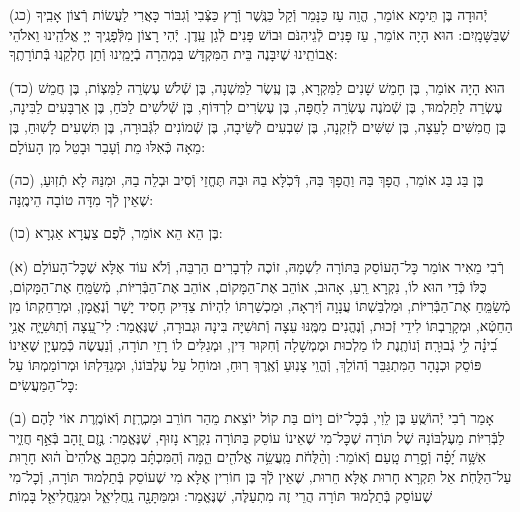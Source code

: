 \documentclass[twoside, openany, parskip=half, 11pt]{book}
\begin{document}
(כג)
יְֿהוּדָה בֶּן תֵּימָא אוֹמֵר, הֱוֵה עַז כַּנָּמֵר וְֿקַל כַּנֶּֽשֶׁר וְֿרָץ כַּצְּֿבִי וְֿגִבּוֹר כָּאֲרִי לַעֲשׂוֹת רְֿצוֹן אָבִֽיךָ שֶׁבַּשָּׁמָֽיִם: הוּא הָיָה אוֹמֵר, עַז פָּנִים לְֿגֵיהִנֹּם וּבוֹשׁ פָּנִים לְֿגַן עֵֽדֶן. יְֿהִי רָצוֹן מִלְּֿפָנֶֽיךָ יְיָ אֱלֹהֵֽינוּ וֵאלֹהֵי אֲבוֹתֵֽינוּ שֶׁיִבָּנֶה בֵּית הַמִּקְדָּשׁ בִּמְהֵרָה בְֿיָמֵֽינוּ וְֿתֵן חֶלְקֵֽנוּ בְּֿתוֹרָתֶֽךָ:

(כד)
הוּא הָיָה אוֹמֵר, בֶּן חָמֵשׁ שָׁנִים לַמִּקְרָא, בֶּן עֶֽשֶׂר לַמִּשְׁנָה, בֶּן שְֿׁלֹשׁ עֶשְׂרֵה לַמִּצְוֹת, בֶּן חֲמֵשׁ עֶשְׂרֵה לַתַּלְמוּד, בֶּן שְֿׁמֹנֶה עֶשְׂרֵה לַחֻפָּה, בֶּן עֶשְׂרִים לִרְדּוֹף, בֶּן שְֿׁלשִׁים לַכֹּחַ, בֶּן אַרְבָּעִים לַבִּינָה, בֶּן חֲמִשִּׁים לָעֵצָה, בֶּן שִׁשִּׁים לְֿזִקְנָה, בֶּן שִׁבְעִים לְֿשֵּׂיבָה, בֶּן שְֿׁמוֹנִים לִגְּֿבוּרָה, בֶּן תִּשְׁעִים לָשֽׁוּחַ, בֶּן מֵאָה כְּֿאִלּוּ מֵת וְֿעָבַר וּבָטֵל מִן הָעוֹלָם:

(כה)
בֶּן בַּג בַּג אוֹמֵר, הֲפָךְ בַּהּ וַהֲפָךְ בַּהּ, דְּֿכֹֽלָּא בַהּ וּבַהּ תֶּחֱזֵי וְֿסִיב וּבְלֵה בַהּ, וּמִנַּהּ לָא תְֿזֽוּעַ, שֶׁאֵין לְֿךָ מִדָּה טוֹבָה הֵימֶֽנָּה:

(כו)
בֶּן הֵא הֵא אוֹמֵר, לְֿפֻם צַעֲרָא אַגְרָא:



\kolyisroel

(א)
רְֿבִי מֵאִיר אוֹמֵר כׇּל־הָעוֹסֵק בַּתּוֹרָה לִשְׁמָהּ, זוֹכֶה לִדְבָרִים הַרְבֵּה, וְֿלֹא עוֹד אֶלָּא שֶׁכׇּל־הָעוֹלָם כֻּלּוֹ כְּֿדַי הוּא לוֹ, נִקְרָא רֵֽעַ, אָהוּב, אוֹהֵב אֶת־הַמָּקוֹם, אוֹהֵב אֶת־הַבְּֿרִיּוֹת, מְֿשַׂמֵּֽחַ אֶת־הַמָּקוֹם, מְֿשַׂמֵּֽחַ אֶת־הַבְּֿרִיּוֹת, וּמַלְבַּשְׁתּוֹ עֲנָוָה וְֿיִרְאָה, וּמַכְשַׁרְתּוֹ לִהְיוֹת צַדִּיק חָסִיד יָשָׁר וְֿנֶאֱמָן, וּמְרַחַקְתּוֹ מִן הַחֵטְֿא, וּמְקָרַבְתּוֹ לִידֵי זְֿכוּת, וְֿנֶהֱנִים מִמֶּֽנּוּ עֵצָה וְֿתוּשִׁיָּה בִּינָה וּגְבוּרָה, שֶׁנֶּאֱמַר: לִי־עֵ֭צָה וְֿתֽוּשִׁיָּ֑ה אֲנִ֥י בִ֝ינָ֗ה לִ֣י גְֿבוּרָֽה׃ וְֿנוֹתֶֽנֶת לוֹ מַלְכוּת וּמֶמְשָׁלָה וְֿחִקּוּר דִּין, וּמְגַלִּים לוֹ רָזֵי תוֹרָה, וְֿנַעֲשֶׂה כְּֿמַעְיָן שֶׁאֵינוֹ פּוֹסֵק וּכְנָהָר הַמִּתְגַּבֵּר וְֿהוֹלֵךְ, וְֿהֱוֵי צָנֽוּעַ וְֿאֶֽרֶךְ רֽוּחַ, וּמוֹחֵל עַל עֶלְבּוֹנוֹ, וּמְגַדַּלְתּוֹ וּמְרוֹמַמְתּוֹ עַל כׇּל־הַמַּעֲשִׂים:

(ב)
אָמַר רְֿבִי יְֿהוֹשֻֽׁעַ בֶּן לֵוִי, בְּֿכׇל־יוֹם וָיוֹם בַּת קוֹל יוֹצֵאת מֵהַר חוֹרֵב וּמַכְרֶֽזֶת וְֿאוֹמֶֽרֶת אוֹי לָהֶם לַבְּֿרִיּוֹת מֵעֶלְבּוֹנָהּ שֶׁל תּוֹרָה שֶׁכׇּל־מִי שֶׁאֵינוֹ עוֹסֵק בַּתּוֹרָה נִקְרָא נָזוּף, שֶׁנֶּאֱמַר: נֶ֣זֶם זָ֭הָב בְּֿאַ֣ף חֲזִ֑יר אִשָּׁ֥ה יָ֝פָ֗ה וְֿסָ֣רַת טָֽעַם׃ וְֿאוֹמֵר: וְהַ֨לֻּחֹ֔ת מַֽעֲשֵׂ֥ה אֱלֹהִ֖ים הֵ֑מָּה וְֿהַמִּכְתָּ֗ב מִכְתַּ֤ב אֱלֹהִים֙ ה֔וּא חָר֖וּת עַל־הַלֻּחֹֽת׃ אַל תִּקְרָא חָרוּת אֶלָּא חֵרוּת, שֶׁאֵין לְֿךָ בֶּן חוֹרִין אֶלָּא מִי שֶׁעוֹסֵק בְּֿתַלְמוּד תּוֹרָה, וְֿכׇל־מִי שֶׁעוֹסֵק בְּֿתַלְמוּד תּוֹרָה הֲרֵי זֶה מִתְעַלֶּה, שֶׁנֶּאֱמַר: וּמִמַּתָּנָ֖ה נַֽחֲלִיאֵ֑ל וּמִנַּֽחֲלִיאֵ֖ל בָּמֽוֹת׃
\end{document}
